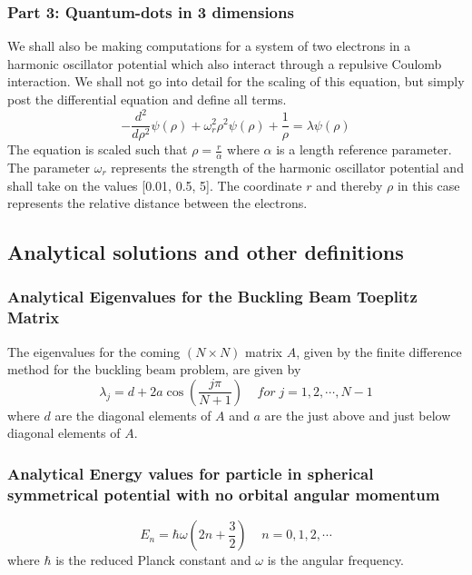 \documentclass[aip,nobalancelastpage,
twocolumn,
rsi,%
 amsmath,amssymb,
 reprint,%
]{revtex4}
\begin{document}
\subsubsection{Part 3: Quantum-dots in 3 dimensions}
We shall also be making computations for a system of two electrons in a harmonic oscillator potential which also interact through a repulsive Coulomb interaction. We shall not go into detail for the scaling of this equation, but simply post the differential equation and define all terms.
\begin{equation}
\label{theory-quantumdotsdiffeq}
-\frac{d^2}{d\rho^2}\psi(\rho) + \omega_r^2 \rho^2\psi(\rho) + \frac{1}{\rho} = \lambda \psi(\rho)
\end{equation}
The equation is scaled such that $\rho = \frac{r}{\alpha}$ where $\alpha$ is a length reference parameter. The parameter $\omega_r$ represents the strength of the harmonic oscillator potential and shall take on the values [0.01, 0.5, 5]. The coordinate $r$ and thereby $\rho$ in this case represents the relative distance between the electrons.

\subsection{Analytical solutions and other definitions}

\subsubsection{Analytical Eigenvalues for the Buckling Beam Toeplitz Matrix}
The eigenvalues for the coming $(N\times N)$ matrix $A$, given by the finite difference method for the buckling beam problem, are given by
\begin{equation}
\label{AnalyticalBucklingEigenvals}
\lambda_j = d + 2a\cos\left(\frac{j \pi}{N+1}\right)\;\;\;\;for\; j =1,2,\cdots,N-1
\end{equation}
where $d$ are the diagonal elements of $A$ and $a$ are the just above and just below diagonal elements of $A$.

\subsubsection{Analytical Energy values for particle in spherical symmetrical potential with no orbital angular momentum}

\begin{equation}
E_n = \hbar \omega \left(2n + \frac{3}{2}\right)\;\;\;\; n=0,1,2,\cdots
\label{Energyval-Analytical}
\end{equation}
where $\hbar$ is the reduced Planck constant and $\omega$ is the angular frequency.
\end{document}
